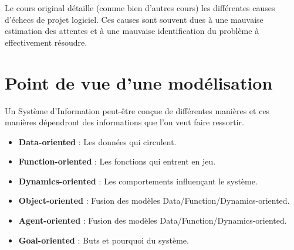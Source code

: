 Le cours original détaille (comme bien d'autres cours) les différentes causes d'échecs de projet logiciel. Ces causes sont souvent dues à une mauvaise estimation des attentes et à une mauvaise identification du problème à effectivement résoudre.

\section{Point de vue d'une modélisation}

Un Système d'Information peut-être conçue de différentes manières et ces manières dépendront des informations que l'on veut faire ressortir.

\begin{itemize}
  \item \textbf{Data-oriented} : Les données qui circulent.
  \item \textbf{Function-oriented} : Les fonctions qui entrent en jeu.
  \item \textbf{Dynamics-oriented} : Les comportements influençant le système.
  \item \textbf{Object-oriented} : Fusion des modèles {Data/Function/Dynamics}-oriented.
  \item \textbf{Agent-oriented} : Fusion des modèles {Data/Function/Dynamics}-oriented.
  \item \textbf{Goal-oriented} : Buts et pourquoi du système.
\end{itemize}
